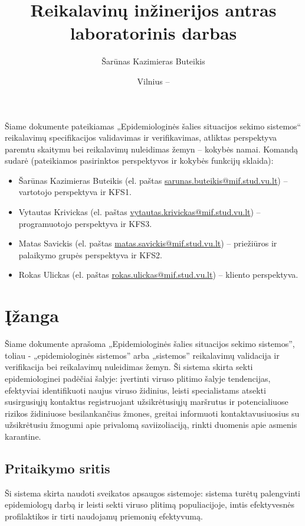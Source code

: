 \documentclass{VUMIFPSkursinis}
\title{Reikalavinų inžinerijos antras laboratorinis darbas}
\author{Šarūnas Kazimieras Buteikis}
\date{Vilnius – \the\year}
\begin{document}
\maketitle


Šiame dokumente pateikiamas „Epidemiologinės šalies situacijos sekimo sistemos“ reikalavimų specifikacijos validavimas ir verifikavimas, atliktas
perspektyva paremtu skaitymu bei reikalavimų nuleidimas žemyn -- kokybės namai. Komandą sudarė (pateikiamos pasirinktos perspektyvos ir kokybės funkcijų sklaida):
\begin{itemize}
	\item Šarūnas Kazimieras Buteikis (el. paštas \href{mailto:sarunas.buteikis@mif.stud.vu.lt}{sarunas.buteikis@mif.stud.vu.lt}) -- vartotojo perspektyva ir KFS1.
	\item Vytautas Krivickas (el. paštas \href{mailto:vytautas.krivickas@mif.stud.vu.lt}{vytautas.krivickas@mif.stud.vu.lt}) -- programuotojo perspektyva ir KFS3.
	\item Matas Savickis (el. paštas \href{mailto:matas.savickis@mif.stud.vu.lt}{matas.savickis@mif.stud.vu.lt}) -- priežiūros ir palaikymo grupės perspektyva ir KFS2.
	\item Rokas Ulickas (el. paštas \href{mailto:rokas.ulickas@mif.stud.vu.lt}{rokas.ulickas@mif.stud.vu.lt}) -- kliento perspektyva.
\end{itemize}

\newpage

\tableofcontents


\section{Įžanga}

Šiame dokumente aprašoma „Epidemiologinės šalies situacijos sekimo sistemos”, toliau - „epidemiologinės sistemos” arba „sistemos”
reikalavimų validacija ir verifikacija bei reikalavimų nuleidimas žemyn.
Ši sistema skirta sekti epidemiologinei padėčiai šalyje: įvertinti viruso plitimo šalyje tendencijas,
efektyviai identifikuoti naujus viruso židinius, leisti specialistams atsekti susirgusiųjų
kontaktus registruojant užsikrėtusiųjų maršrutus ir potencialiuose rizikos židiniuose
besilankančius žmones, greitai informuoti kontaktavusiuosius su užsikrėtusiu žmogumi
apie privalomą saviizoliaciją, rinkti duomenis apie asmenis karantine.

\subsection{Pritaikymo sritis}
Ši sistema skirta naudoti sveikatos apsaugos sistemoje: sistema turėtų palengvinti
epidemiologų darbą ir leisti sekti viruso plitimą populiacijoje, imtis efektyvesnės
profilaktikos ir tirti naudojamų priemonių efektyvumą.
\end{document}
